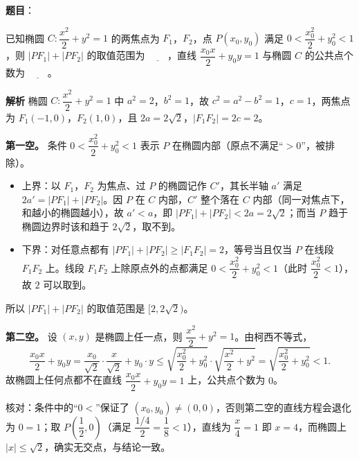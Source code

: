 \begin{answer}

\textbf{题目}：

已知椭圆 $C:\dfrac{x^2}{2}+y^2=1$ 的两焦点为 $F_1$，$F_2$，点 $P(x_0,y_0)$ 满足 $0<\dfrac{x_0^2}{2}+y_0^2<1$，则 $|PF_1|+|PF_2|$ 的取值范围为 $\underline{\qquad}$，直线 $\dfrac{x_0x}{2}+y_0y=1$ 与椭圆 $C$ 的公共点个数为 $\underline{\qquad}$。

\textbf{解析}
椭圆 $C:\dfrac{x^2}{2}+y^2=1$ 中 $a^2=2$，$b^2=1$，故 $c^2=a^2-b^2=1$，$c=1$，两焦点为 $F_1(-1,0)$，$F_2(1,0)$，且 $2a=2\sqrt2$，$|F_1F_2|=2c=2$。

\textbf{第一空。} 条件 $0<\dfrac{x_0^2}{2}+y_0^2<1$ 表示 $P$ 在椭圆内部（原点不满足“$>0$”，被排除）。
\begin{itemize}
\item 上界：以 $F_1$，$F_2$ 为焦点、过 $P$ 的椭圆记作 $C'$，其长半轴 $a'$ 满足 $2a'=|PF_1|+|PF_2|$。因 $P$ 在 $C$ 内部，$C'$ 整个落在 $C$ 内部（同一对焦点下，和越小的椭圆越小），故 $a'<a$，即 $|PF_1|+|PF_2|<2a=2\sqrt2$；而当 $P$ 趋于椭圆边界时该和趋于 $2\sqrt2$，取不到。
\item 下界：对任意点都有 $|PF_1|+|PF_2|\geqslant|F_1F_2|=2$，等号当且仅当 $P$ 在线段 $F_1F_2$ 上。线段 $F_1F_2$ 上除原点外的点都满足 $0<\dfrac{x_0^2}{2}+y_0^2<1$（此时 $\dfrac{x_0^2}{2}<1$），故 $2$ 可以取到。
\end{itemize}

所以 $|PF_1|+|PF_2|$ 的取值范围是 $[2,2\sqrt2)$。

\textbf{第二空。} 设 $(x,y)$ 是椭圆上任一点，则 $\dfrac{x^2}{2}+y^2=1$。由柯西不等式，
\nopagebreak[4]
\[\frac{x_0x}{2}+y_0y=\frac{x_0}{\sqrt2}\cdot\frac{x}{\sqrt2}+y_0\cdot y
\leqslant\sqrt{\frac{x_0^2}{2}+y_0^2}\cdot\sqrt{\frac{x^2}{2}+y^2}=\sqrt{\frac{x_0^2}{2}+y_0^2}<1.\]
故椭圆上任何点都不在直线 $\dfrac{x_0x}{2}+y_0y=1$ 上，公共点个数为 $0$。

核对：条件中的“$0<$”保证了 $(x_0,y_0)\ne(0,0)$，否则第二空的直线方程会退化为 $0=1$；取 $P\left(\dfrac12,0\right)$（满足 $\dfrac{1/4}{2}=\dfrac18<1$），直线为 $\dfrac{x}{4}=1$ 即 $x=4$，而椭圆上 $|x|\leqslant\sqrt2$，确实无交点，与结论一致。

\gkanswer{答案：$[2,2\sqrt2)$；$0$。}

\end{answer}
